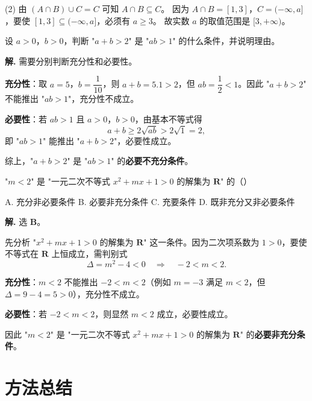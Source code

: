 \documentclass[11pt]{ctexrep}
\begin{document}
(2) 由 $(A \cap B) \cup C = C$ 可知 $A \cap B \subseteq C$。
因为 $A \cap B = [1, 3]$，$C = (-\infty, a]$，要使 $[1, 3] \subseteq (-\infty, a]$，必须有 $a \geq 3$。
故实数 $a$ 的取值范围是 $[3, +\infty)$。

\begin{example}[充分必要条件的判定]
    设 $a > 0$，$b > 0$，判断 "$a + b > 2$" 是 "$ab > 1$" 的什么条件，并说明理由。
\end{example}

\textbf{解.} 需要分别判断充分性和必要性。

\textbf{充分性}：取 $a = 5$，$b = \dfrac{1}{10}$，则 $a + b = 5.1 > 2$，但 $ab = \dfrac{1}{2} < 1$。因此 "$a + b > 2$" 不能推出 "$ab > 1$"，充分性不成立。

\textbf{必要性}：若 $ab > 1$ 且 $a > 0$，$b > 0$，由基本不等式得
\[
    a + b \geq 2\sqrt{ab} > 2\sqrt{1} = 2,
\]
即 "$ab > 1$" 能推出 "$a + b > 2$"，必要性成立。

综上，"$a + b > 2$" 是 "$ab > 1$" 的\textbf{必要不充分条件}。

\begin{realexam}[2025 届上海高三二模·静安]
    "$m < 2$" 是 "一元二次不等式 $x^{2} + mx + 1 > 0$ 的解集为 $\mathbf{R}$" 的\hfill（\quad）

    A. 充分非必要条件 \quad B. 必要非充分条件 \quad C. 充要条件 \quad D. 既非充分又非必要条件
\end{realexam}

\textbf{解.} 选 \textbf{B}。

先分析 "$x^{2} + mx + 1 > 0$ 的解集为 $\mathbf{R}$" 这一条件。因为二次项系数为 $1 > 0$，要使不等式在 $\mathbf{R}$ 上恒成立，需判别式
\[
    \Delta = m^{2} - 4 < 0 \quad \Longrightarrow \quad -2 < m < 2.
\]

\textbf{充分性}：$m < 2$ 不能推出 $-2 < m < 2$（例如 $m = -3$ 满足 $m < 2$，但 $\Delta = 9 - 4 = 5 > 0$），充分性不成立。

\textbf{必要性}：若 $-2 < m < 2$，则显然 $m < 2$ 成立，必要性成立。

因此 "$m < 2$" 是 "一元二次不等式 $x^{2} + mx + 1 > 0$ 的解集为 $\mathbf{R}$" 的\textbf{必要非充分条件}。

\section*{方法总结}
\end{document}
